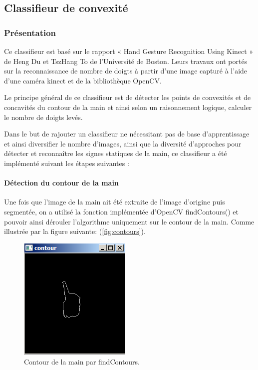 \subsection{Classifieur de convexité}
\subsubsection{Présentation}

Ce classifieur est basé sur le rapport « Hand Gesture Recognition Using Kinect » de Heng Du et TszHang To de l’Université de Boston.  Leurs travaux ont portés sur la reconnaissance de nombre de doigts à partir d’une image capturé à l’aide d’une caméra kinect et de la bibliothèque OpenCV. 

Le principe général de ce classifieur est de détecter les points de convexités et de concavités du contour de la main et ainsi selon un raisonnement logique, calculer le nombre de doigts levés.

Dans le but de rajouter un classifieur ne nécessitant pas de base d’apprentissage et ainsi diversifier le nombre d’images, ainsi que la diversité d’approches pour détecter et reconnaître les signes statiques de la main, ce classifieur a été implémenté suivant les étapes suivantes :

\paragraph{Détection du contour de la main}
Une fois que l’image de la main ait été extraite de l’image d’origine puis segmentée, on a utilisé la fonction implémentée d’OpenCV findContours() et pouvoir ainsi dérouler l’algorithme uniquement sur le contour de la main. Comme illustrée par la figure suivante:  (\autoref{fig:contours}).

\begin{figure}[htb!]
\centerline{\includegraphics{contours.png}}
\caption{Contour de la main par findContours.}
\label{fig:contours}
\end{figure}

